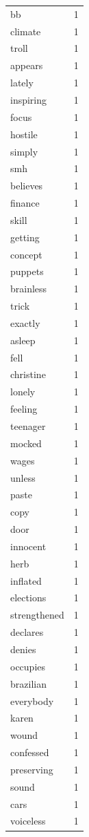 \begin{tabular}{lr}
bb & 1 \\
climate & 1 \\
troll & 1 \\
appears & 1 \\
lately & 1 \\
inspiring & 1 \\
focus & 1 \\
hostile & 1 \\
simply & 1 \\
smh & 1 \\
believes & 1 \\
finance & 1 \\
skill & 1 \\
getting & 1 \\
concept & 1 \\
puppets & 1 \\
brainless & 1 \\
trick & 1 \\
exactly & 1 \\
asleep & 1 \\
fell & 1 \\
christine & 1 \\
lonely & 1 \\
feeling & 1 \\
teenager & 1 \\
mocked & 1 \\
wages & 1 \\
unless & 1 \\
paste & 1 \\
copy & 1 \\
door & 1 \\
innocent & 1 \\
herb & 1 \\
inflated & 1 \\
elections & 1 \\
strengthened & 1 \\
declares & 1 \\
denies & 1 \\
occupies & 1 \\
brazilian & 1 \\
everybody & 1 \\
karen & 1 \\
wound & 1 \\
confessed & 1 \\
preserving & 1 \\
sound & 1 \\
cars & 1 \\
voiceless & 1 \\

\end{tabular}
